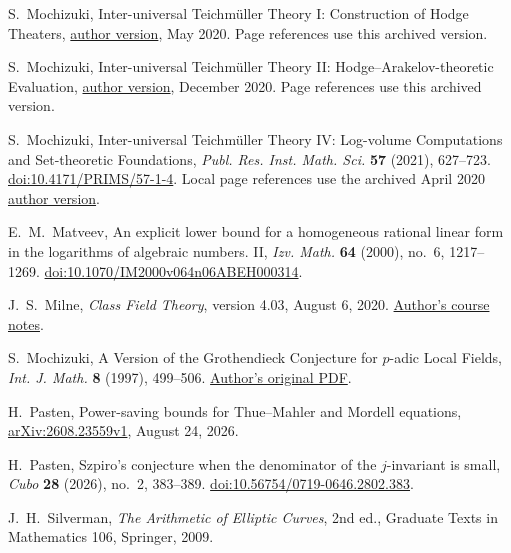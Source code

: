 \documentclass[11pt]{amsart}
\theoremstyle{definition}
\theoremstyle{remark}
\begin{document}
\begin{thebibliography}{99}
S.~Mochizuki, Inter-universal Teichm\"uller Theory I:
Construction of Hodge Theaters,
\href{https://www.kurims.kyoto-u.ac.jp/~motizuki/Inter-universal%20Teichmuller%20Theory%20I.pdf}{author version}, May 2020.
Page references use this archived version.

S.~Mochizuki, Inter-universal Teichm\"uller Theory II:
Hodge--Arakelov-theoretic Evaluation,
\href{https://www.kurims.kyoto-u.ac.jp/~motizuki/Inter-universal%20Teichmuller%20Theory%20II.pdf}{author version}, December 2020.
Page references use this archived version.

S.~Mochizuki, Inter-universal Teichm\"uller Theory IV:
Log-volume Computations and Set-theoretic Foundations,
\emph{Publ. Res. Inst. Math. Sci.} \textbf{57} (2021), 627--723.
\href{https://doi.org/10.4171/PRIMS/57-1-4}{doi:10.4171/PRIMS/57-1-4}.
Local page references use the archived April 2020
\href{https://www.kurims.kyoto-u.ac.jp/~motizuki/Inter-universal%20Teichmuller%20Theory%20IV.pdf}{author version}.

E.~M.~Matveev, An explicit lower bound for a homogeneous rational linear
form in the logarithms of algebraic numbers. II,
\emph{Izv. Math.} \textbf{64} (2000), no.~6, 1217--1269.
\href{https://doi.org/10.1070/IM2000v064n06ABEH000314}{doi:10.1070/IM2000v064n06ABEH000314}.

J.~S.~Milne, \emph{Class Field Theory}, version 4.03, August 6, 2020.
\href{https://www.jmilne.org/math/CourseNotes/CFT.pdf}{Author's course notes}.

S.~Mochizuki, A Version of the Grothendieck Conjecture for $p$-adic
Local Fields, \emph{Int. J. Math.} \textbf{8} (1997), 499--506.
\href{https://www.kurims.kyoto-u.ac.jp/~motizuki/A%20Version%20of%20the%20Grothendieck%20Conjecture%20for%20p-adic%20Local%20Fields.pdf}{Author's original PDF}.

H.~Pasten, Power-saving bounds for Thue--Mahler and Mordell equations,
\href{https://arxiv.org/abs/2608.23559v1}{arXiv:2608.23559v1}, August 24, 2026.

H.~Pasten, Szpiro's conjecture when the denominator of the $j$-invariant
is small, \emph{Cubo} \textbf{28} (2026), no.~2, 383--389.
\href{https://doi.org/10.56754/0719-0646.2802.383}{doi:10.56754/0719-0646.2802.383}.

J.~H.~Silverman, \emph{The Arithmetic of Elliptic Curves},
2nd ed., Graduate Texts in Mathematics 106, Springer, 2009.


\end{thebibliography}
\end{document}
